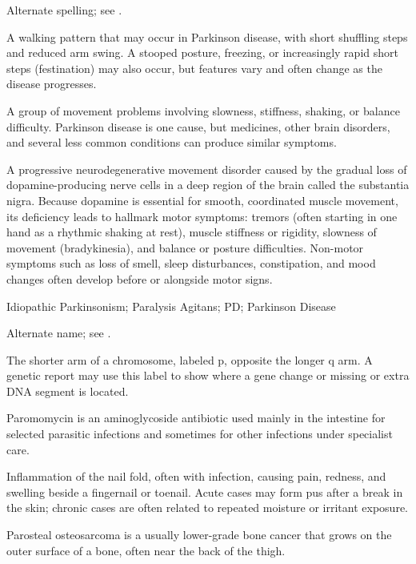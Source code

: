  Alternate spelling; see .

 A walking pattern that may occur in Parkinson disease, with short shuffling steps and reduced arm swing. A stooped posture, freezing, or increasingly rapid short steps (festination) may also occur, but features vary and often change as the disease progresses.

 A group of movement problems involving slowness, stiffness, shaking, or balance difficulty. Parkinson disease is one cause, but medicines, other brain disorders, and several less common conditions can produce similar symptoms.

 A progressive neurodegenerative movement disorder caused by the gradual loss of dopamine-producing nerve cells in a deep region of the brain called the substantia nigra. Because dopamine is essential for smooth, coordinated muscle movement, its deficiency leads to hallmark motor symptoms: tremors (often starting in one hand as a rhythmic shaking at rest), muscle stiffness or rigidity, slowness of movement (bradykinesia), and balance or posture difficulties. Non-motor symptoms such as loss of smell, sleep disturbances, constipation, and mood changes often develop before or alongside motor signs.

\synonyms
Idiopathic Parkinsonism; Paralysis Agitans; PD; Parkinson Disease

 Alternate name; see .

 The shorter arm of a chromosome, labeled p, opposite the longer q arm. A genetic report may use this label to show where a gene change or missing or extra DNA segment is located.

 Paromomycin is an aminoglycoside antibiotic used mainly in the intestine for selected parasitic infections and sometimes for other infections under specialist care.

 Inflammation of the nail fold, often with infection, causing pain, redness, and swelling beside a fingernail or toenail. Acute cases may form pus after a break in the skin; chronic cases are often related to repeated moisture or irritant exposure.

 Parosteal osteosarcoma is a usually lower-grade bone cancer that grows on the outer surface of a bone, often near the back of the thigh.


